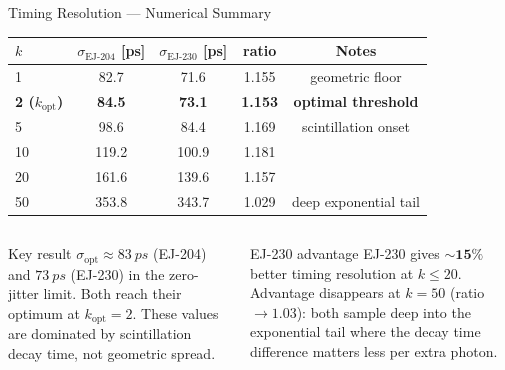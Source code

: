\documentclass[aspectratio=169,10pt]{beamer}
\begin{document}
\begin{frame}{Timing Resolution --- Numerical Summary}

\begin{center}
\small
\renewcommand{\arraystretch}{1.25}
\begin{tabular}{@{}lSSSS@{}}
  \toprule
  \textbf{$k$} &
  {\textbf{$\sigma_\text{EJ-204}$ [ps]}} &
  {\textbf{$\sigma_\text{EJ-230}$ [ps]}} &
  {\textbf{ratio}} &
  \textbf{Notes} \\
   & 82.7 & 71.6 & 1.155 & {geometric floor} \\
  \bfseries{2 ($k_\text{opt}$)} & \bfseries{84.5} & \bfseries{73.1} & \bfseries{1.153} & \bfseries{optimal threshold} \\
  5 & 98.6 & 84.4 & 1.169 & {scintillation onset} \\
  10 & 119.2 & 100.9 & 1.181 & \\
  20 & 161.6 & 139.6 & 1.157 & \\
  50 & 353.8 & 343.7 & 1.029 & {deep exponential tail} \\
  \bottomrule
\end{tabular}
\end{center}

\vspace{0.4em}
\begin{columns}[T]
  \begin{column}{0.48\textwidth}
  \begin{alertblock}{Key result}
    $\sigma_\text{opt} \approx \SI{83}{ps}$ (EJ-204) and $\SI{73}{ps}$ (EJ-230)
    in the zero-jitter limit.
    Both reach their optimum at $k_\text{opt}=2$.
    These values are dominated by scintillation decay time,
    not geometric spread.
  \end{alertblock}
  \end{column}
  \begin{column}{0.48\textwidth}
  \begin{alertblock}{EJ-230 advantage}
    EJ-230 gives $\sim\!\mathbf{15\%}$ better timing resolution
    at $k \leq 20$.
    Advantage disappears at $k=50$ (ratio $\to 1.03$):
    both sample deep into the exponential tail where
    the decay time difference matters less per extra photon.
  \end{alertblock}
  \end{column}
\end{columns}

\end{frame}
\end{document}
